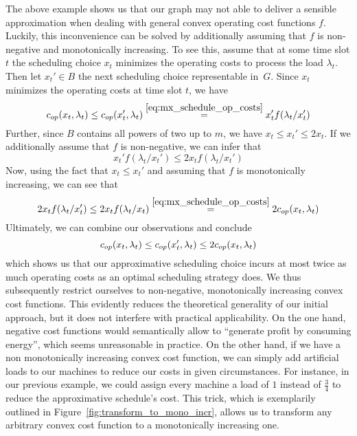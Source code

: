 The above example shows us that our graph may not able to deliver a sensible approximation when dealing with general convex operating cost functions $f$. Luckily, this inconvenience can be solved by additionally assuming that $f$ is non-negative and monotonically increasing. To see this, assume that at some time slot $t$ the scheduling choice $x_t$ minimizes the operating costs to process the load $\lambda_t$. Then let $x_t'\in B$ the next scheduling choice representable in~$G$. Since $x_t$ minimizes the operating costs at time slot $t$, we have
\begin{equation*}
	c_{op}(x_t,\lambda_t)\le c_{op}(x_t',\lambda_t)\stackrel{\eqref{eq:mx_schedule_op_costs}}{=}x_t'f(\lambda_t/x_t')
\end{equation*}
Further, since $B$ contains all powers of two up to $m$, we have $x_t\le x_t'\le 2x_t$. If we additionally assume that $f$ is non-negative, we can infer that
\begin{equation*}
	x_t'f(\lambda_t/x_t')\le2x_tf(\lambda_t/x_t')
\end{equation*}
Now, using the fact that $x_t\le x_t'$ and assuming that $f$ is monotonically increasing, we can see that
\begin{equation*}
	2x_tf(\lambda_t/x_t')\le 2x_tf(\lambda_t/x_t)\stackrel{\eqref{eq:mx_schedule_op_costs}}{=}2c_{op}(x_t,\lambda_t)
\end{equation*}
Ultimately, we can combine our observations and conclude
\begin{equation*}
	c_{op}(x_t,\lambda_t)\le c_{op}(x_t',\lambda_t)\le2c_{op}(x_t,\lambda_t)
\end{equation*}
which shows us that our approximative scheduling choice incurs at most twice as much operating costs as an optimal scheduling strategy does. We thus subsequently restrict ourselves to non-negative, monotonically increasing convex cost functions. This evidently reduces the theoretical generality of our initial approach, but it does not interfere with practical applicability. On the one hand, negative cost functions would semantically allow to ``generate profit by consuming energy'', which seems unreasonable in practice. On the other hand, if we have a non monotonically increasing convex cost function, we can simply add artificial loads to our machines to reduce our costs in given circumstances. For instance, in our previous example, we could assign every machine a load of $1$ instead of $\frac{3}{4}$ to reduce the approximative schedule's cost. This trick, which is exemplarily outlined in Figure~\ref{fig:transform_to_mono_incr}, allows us to transform any arbitrary convex cost function to a monotonically increasing one.
